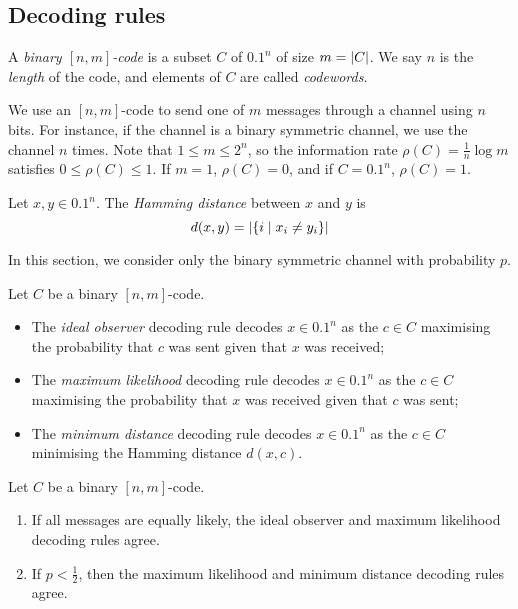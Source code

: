 \subsection{Decoding rules}
\begin{definition}
    A \emph{binary \( [n,m] \)-code} is a subset \( C \) of \( \qty{0,1}^n \) of size \( m = \abs{C} \).
    We say \( n \) is the \emph{length} of the code, and elements of \( C \) are called \emph{codewords}.
\end{definition}
We use an \( [n,m] \)-code to send one of \( m \) messages through a channel using \( n \) bits.
For instance, if the channel is a binary symmetric channel, we use the channel \( n \) times.
Note that \( 1 \leq m \leq 2^n \), so the information rate \( \rho(C) = \frac{1}{n} \log m \) satisfies \( 0 \leq \rho(C) \leq 1 \).
If \( m = 1 \), \( \rho(C) = 0 \), and if \( C = \qty{0,1}^n \), \( \rho(C) = 1 \).
\begin{definition}
    Let \( x, y \in \qty{0,1}^n \).
    The \emph{Hamming distance} between \( x \) and \( y \) is
    \[ d(x,y) = \abs{\qty{i \mid x_i \neq y_i}} \]
\end{definition}
In this section, we consider only the binary symmetric channel with probability \( p \).
\begin{definition}
    Let \( C \) be a binary \( [n,m] \)-code.
    \begin{itemize}
        \item The \emph{ideal observer} decoding rule decodes \( x \in \qty{0,1}^n \) as the \( c \in C \) maximising the probability that \( c \) was sent given that \( x \) was received;
        \item The \emph{maximum likelihood} decoding rule decodes \( x \in \qty{0,1}^n \) as the \( c \in C \) maximising the probability that \( x \) was received given that \( c \) was sent;
        \item The \emph{minimum distance} decoding rule decodes \( x \in \qty{0,1}^n \) as the \( c \in C \) minimising the Hamming distance \( d(x,c) \).
    \end{itemize}
\end{definition}
\begin{lemma}
    Let \( C \) be a binary \( [n,m] \)-code.
    \begin{enumerate}
        \item If all messages are equally likely, the ideal observer and maximum likelihood decoding rules agree.
        \item If \( p < \frac{1}{2} \), then the maximum likelihood and minimum distance decoding rules agree.
    \end{enumerate}
\end{lemma}
